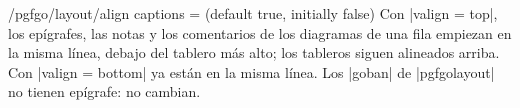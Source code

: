 \begin{key}{/pgfgo/layout/align captions =  (default true, initially false)}
	Con |valign = top|, los epígrafes, las notas y los comentarios de los diagramas de una fila empiezan en la misma línea, debajo del tablero más alto; los tableros siguen alineados arriba. Con |valign = bottom| ya están en la misma línea. Los |goban| de |pgfgolayout| no tienen epígrafe: no cambian.

	\begin{codeexample}
	\end{codeexample}
\end{key}
